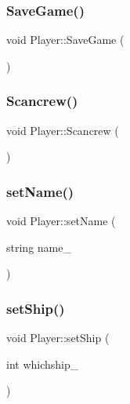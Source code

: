 \mbox{\label{class_player_af3e4d935acf14a7f75af9e034c84c668}} 
\subsubsection{\texorpdfstring{Save\+Game()}{SaveGame()}}
{\footnotesize\ttfamily void Player\+::\+Save\+Game (\begin{DoxyParamCaption}{ }\end{DoxyParamCaption})}

\mbox{\label{class_player_aca8061cbd726027026078362a7864fc9}} 
\subsubsection{\texorpdfstring{Scancrew()}{Scancrew()}}
{\footnotesize\ttfamily void Player\+::\+Scancrew (\begin{DoxyParamCaption}{ }\end{DoxyParamCaption})}

\mbox{\label{class_player_a39ac9846fd6c4e10721aa1e27aa0fefc}} 
\subsubsection{\texorpdfstring{set\+Name()}{setName()}}
{\footnotesize\ttfamily void Player\+::set\+Name (\begin{DoxyParamCaption}\item[{string}]{name\+\_\+ }\end{DoxyParamCaption})\hspace{0.3cm}{\ttfamily [inline]}}

\mbox{\label{class_player_a6741206aebacced45148788c7f847631}} 
\subsubsection{\texorpdfstring{set\+Ship()}{setShip()}}
{\footnotesize\ttfamily void Player\+::set\+Ship (\begin{DoxyParamCaption}\item[{int}]{whichship\+\_\+ }\end{DoxyParamCaption})\hspace{0.3cm}{\ttfamily [inline]}}

